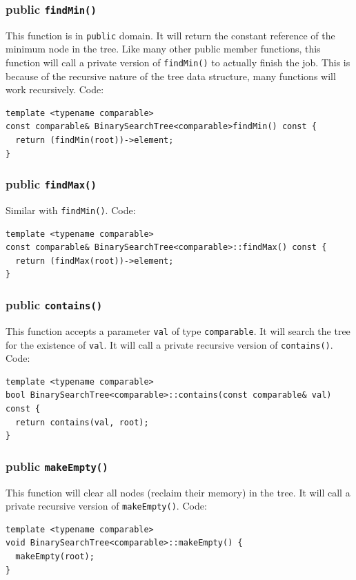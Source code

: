 \documentclass[12pt]{book}
\begin{document}
\subsubsection{public \texttt{findMin()}}
\label{sec:orgd68f251}
This function is in \texttt{public} domain. It will return the constant reference of the minimum node in the tree. Like many other public member functions, this function will call a private version of \texttt{findMin()} to actually finish the job. This is because of the recursive nature of the tree data structure, many functions will work recursively. Code:
\begin{verbatim}
template <typename comparable>
const comparable& BinarySearchTree<comparable>findMin() const {
  return (findMin(root))->element;
}
\end{verbatim}

\subsubsection{public \texttt{findMax()}}
\label{sec:orgdddd89d}
Similar with \texttt{findMin()}. Code:
\begin{verbatim}
template <typename comparable>
const comparable& BinarySearchTree<comparable>::findMax() const {
  return (findMax(root))->element;
}
\end{verbatim}

\subsubsection{public \texttt{contains()}}
\label{sec:org6da3ac3}
This function accepts a parameter \texttt{val} of type \texttt{comparable}. It will search the tree for the existence of \texttt{val}. It will call a private recursive version of \texttt{contains()}. Code:
\begin{verbatim}
template <typename comparable>
bool BinarySearchTree<comparable>::contains(const comparable& val) const {
  return contains(val, root);
}
\end{verbatim}

\subsubsection{public \texttt{makeEmpty()}}
\label{sec:orga833f89}
This function will clear all nodes (reclaim their memory) in the tree. It will call a private recursive version of \texttt{makeEmpty()}. Code:
\begin{verbatim}
template <typename comparable>
void BinarySearchTree<comparable>::makeEmpty() {
  makeEmpty(root);
}
\end{verbatim}
\end{document}
